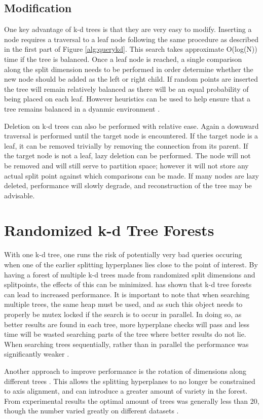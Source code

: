 \subsection{Modification}

One key advantage of k-d trees is that they are very easy to modify.  Inserting a node requires a traversal to a leaf node following the same procedure as described in the first part of Figure \ref{alg:querykd}.  This search takes approximate O(log(N)) time if the tree is balanced.  Once a leaf node is reached, a single comparison along the split dimension needs to be performed in order determine whether the new node should be added as the left or right child.  If random points are inserted the tree will remain relatively balanced as there will be an equal probability of being placed on each leaf.  However heuristics can be used to help ensure that a tree remains balanced in a dyanmic environment \citep{hunt2006fast}.

Deletion on k-d trees can also be performed with relative ease.  Again a downward traversal is performed until the target node is encountered. If the target node is a leaf, it can be removed trivially by removing the connection from its parent.  If the target node is not a leaf, lazy deletion can be performed.  The node will not be removed and will still serve to partition space; however it will not store any actual split point against which comparisons can be made.  If many nodes are lazy deleted, performance will slowly degrade, and reconstruction of the tree may be advisable.

\section{Randomized k-d Tree Forests}

With one k-d tree, one runs the risk of potentially very bad queries occuring when one of the earlier splitting hyperplanes lies close to the point of interest.  By having a forest of multiple k-d trees made from randomized split dimensions and splitpoints, the effects of this can be minimized.  \citep{silpa2008optimised} has shown that k-d tree forests can lead to increased performance.  It is important to note that when searching multiple trees, the same heap must be used, and as such this object needs to properly be mutex locked if the search is to occur in parallel.  In doing so, as better results are found in each tree, more hyperplane checks will pass and less time will be wasted searching parts of the tree where better results do not lie.  When searching trees sequentially, rather than in parallel the performance was significantly weaker \citep{silpa2008optimised}.

Another approach to improve performance is the rotation of dimensions along different trees \citep{silpa2008optimised}.  This allows the splitting hyperplanes to no longer be constrained to axis alignment, and can introduce a greater amount of variety in the forest.  From experimental results the optimal amount of trees was generally less than 20, though the number varied greatly on different datasets \citep{muja_flann_2009}.